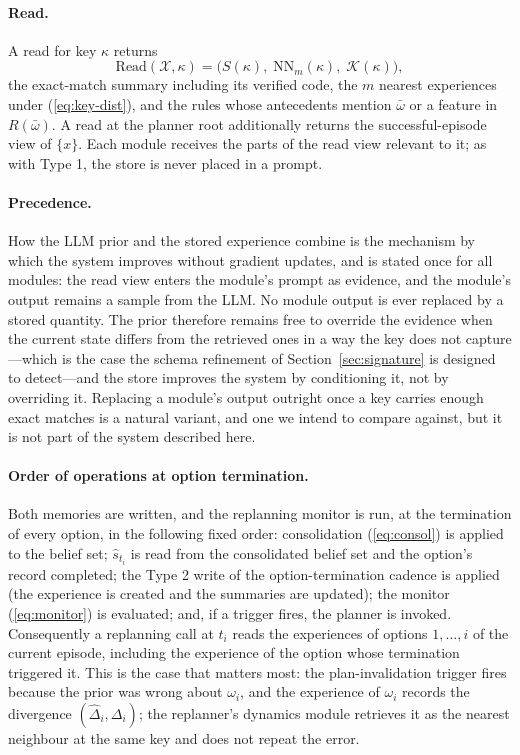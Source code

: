 \documentclass[11pt]{article}
\newcommand{\calK}{\mathcal{K}}
\newcommand{\calX}{\mathcal{X}}
\newcommand{\Rel}{R}
\newcommand{\shat}{\hat{s}}
\newcommand{\Read}{\mathrm{Read}}
\begin{document}
\paragraph{Read.}
A read for key $\kappa$ returns
\begin{equation}
\Read(\calX,\kappa)=\big(S(\kappa),\;\mathrm{NN}_m(\kappa),\;\calK(\kappa)\big),
\label{eq:type2-read}
\end{equation}
the exact-match summary including its verified code, the $m$ nearest experiences under (\ref{eq:key-dist}), and the rules whose antecedents mention $\bar\omega$ or a feature in $\Rel(\bar\omega)$. A read at the planner root additionally returns the successful-episode view of $\{x\}$. Each module receives the parts of the read view relevant to it; as with Type 1, the store is never placed in a prompt.

\paragraph{Precedence.}
How the LLM prior and the stored experience combine is the mechanism by which the system improves without gradient updates, and is stated once for all modules: the read view enters the module's prompt as evidence, and the module's output remains a sample from the LLM. No module output is ever replaced by a stored quantity. The prior therefore remains free to override the evidence when the current state differs from the retrieved ones in a way the key does not capture---which is the case the schema refinement of Section~\ref{sec:signature} is designed to detect---and the store improves the system by conditioning it, not by overriding it. Replacing a module's output outright once a key carries enough exact matches is a natural variant, and one we intend to compare against, but it is not part of the system described here.

\paragraph{Order of operations at option termination.}
Both memories are written, and the replanning monitor is run, at the termination of every option, in the following fixed order: consolidation (\ref{eq:consol}) is applied to the belief set; $\shat_{t_i}$ is read from the consolidated belief set and the option's record completed; the Type 2 write of the option-termination cadence is applied (the experience is created and the summaries are updated); the monitor (\ref{eq:monitor}) is evaluated; and, if a trigger fires, the planner is invoked. Consequently a replanning call at $t_i$ reads the experiences of options $1,\dots,i$ of the current episode, including the experience of the option whose termination triggered it. This is the case that matters most: the plan-invalidation trigger fires because the prior was wrong about $\omega_i$, and the experience of $\omega_i$ records the divergence $(\hat\Delta_i,\Delta_i)$; the replanner's dynamics module retrieves it as the nearest neighbour at the same key and does not repeat the error.
\end{document}
